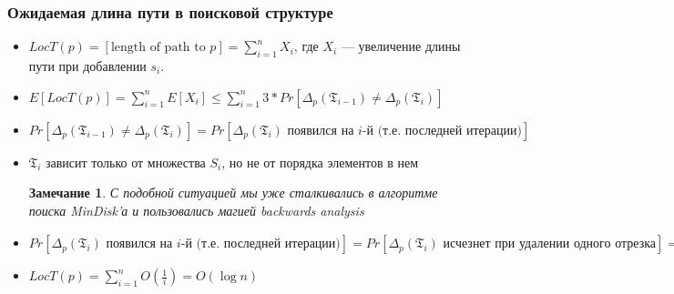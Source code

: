 \documentclass{beamer}
\newtheorem*{remark}{Замечание}
\begin{document}
\begin{frame}
    \frametitle{Ожидаемая длина пути в поисковой структуре}

    \begin{itemize}
    
    \pause
    \item $LocT(p) = [\text{length of path to }p] = \sum_{i=1}^n X_i$, где $X_i$ --- увеличение длины пути при добавлении $s_i$.
    
    \pause
    \item $E[LocT(p)] = \sum_{i=1}^n E[X_i] \le \sum_{i=1}^n 3 * Pr[\Delta_p(\mathfrak{T}_{i-1}) \neq \Delta_p(\mathfrak{T}_{i})]$ 

    \pause
    \item $Pr[\Delta_p(\mathfrak{T}_{i-1}) \neq \Delta_p(\mathfrak{T}_{i})] = Pr[\Delta_p(\mathfrak{T}_{i}) \text{ появился на } i \text{-й (т.е. последней итерации)}]$

    \pause
    \item $\mathfrak{T}_{i}$ зависит только от множества $S_i$, но не от порядка элементов в нем  
    
    \pause     
    \begin{remark}
        С подобной ситуацией мы уже сталкивались в алгоритме поиска MinDisk'а и пользовались магией backwards analysis 
    \end{remark}

    \pause
    \item $Pr[\Delta_p(\mathfrak{T}_{i}) \text{ появился на } i \text{-й (т.е. последней итерации)}] 
            = Pr[\Delta_p(\mathfrak{T}_{i}) \text{ исчезнет при удалении одного отрезка}] 
            = \frac{\text{число отрезков ``держащих'' } \Delta_p(\mathfrak{T}_{i})}{i} = O(\frac{1}{i})$

    \pause
    \item $LocT(p) = \sum_{i=1}^n O(\frac{1}{i}) = O(\log n)$

    \end{itemize}
\end{frame}
\end{document}
